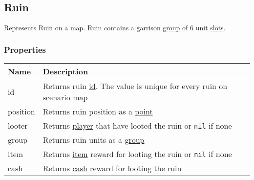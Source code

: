 \subsection{Ruin}
\label{Ruin}
Represents Ruin on a map. Ruin contains a garrison \hyperref[Group]{group} of 6 unit \hyperref[UnitSlot]{slots}.
\subsubsection{Properties}
\begin{center}
\begin{tabularx}{\linewidth}{| l | X |}
\hline
\textbf{Name} & \textbf{Description} \\
\hline
id & Returns ruin \hyperref[Id]{id}. The value is unique for every ruin on scenario map\\
\hline
position & Returns ruin position as a \hyperref[Point]{point}\\
\hline
looter & Returns \hyperref[Player]{player} that have looted the ruin or \texttt{nil} if none\\
\hline
group & Returns ruin units as a \hyperref[Group]{group}\\
\hline
item & Returns \hyperref[Item]{item} reward for looting the ruin or \texttt{nil} if none\\
\hline
cash & Returns \hyperref[Currency]{cash} reward for looting the ruin\\
\hline
\end{tabularx}
\end{center}